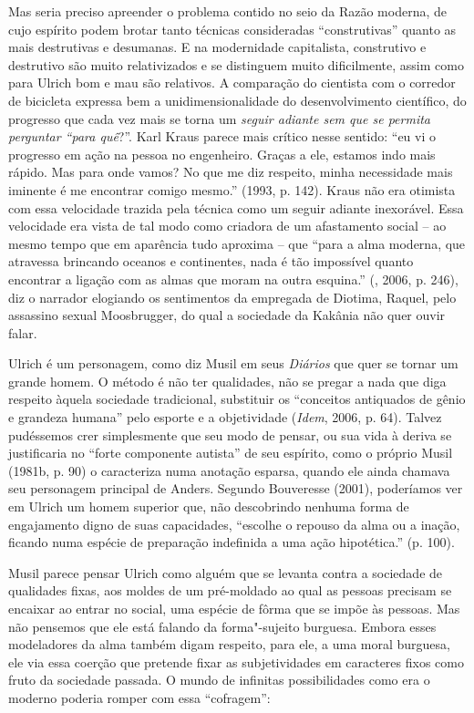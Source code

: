 Mas seria preciso apreender o problema contido no seio da Razão moderna,
de cujo espírito podem brotar tanto técnicas consideradas
``construtivas'' quanto as mais destrutivas e desumanas. E na
modernidade capitalista, construtivo e destrutivo são muito
relativizados e se distinguem muito dificilmente, assim como para Ulrich
bom e mau são relativos. A comparação do cientista com o corredor de
bicicleta expressa bem a unidimensionalidade do desenvolvimento
científico, do progresso que cada vez mais se torna um \emph{seguir
adiante sem que se permita perguntar ``para quê}?''. Karl Kraus parece
mais crítico nesse sentido: ``eu vi o progresso em ação na pessoa no
engenheiro. Graças a ele, estamos indo mais rápido. Mas para onde vamos?
No que me diz respeito, minha necessidade mais iminente é me encontrar
comigo mesmo.'' (1993, p. 142). Kraus não era otimista com essa
velocidade trazida pela técnica como um seguir adiante inexorável. Essa
velocidade era vista de tal modo como criadora de um afastamento social
-- ao mesmo tempo que em aparência tudo aproxima -- que ``para a alma
moderna, que atravessa brincando oceanos e continentes, nada é tão
impossível quanto encontrar a ligação com as almas que moram na outra
esquina.'' (, 2006, p. 246), diz o narrador elogiando os
sentimentos da empregada de Diotima, Raquel, pelo assassino sexual
Moosbrugger, do qual a sociedade da Kakânia não quer ouvir falar.

Ulrich é um personagem, como diz Musil em seus \emph{Diários} que quer
se tornar um grande homem. O método é não ter qualidades, não se pregar
a nada que diga respeito àquela sociedade tradicional, substituir os
``conceitos antiquados de gênio e grandeza humana'' pelo esporte e a
objetividade (\emph{Idem}, 2006, p. 64). Talvez pudéssemos crer simplesmente
que seu modo de pensar, ou sua vida à deriva se justificaria no ``forte
componente autista'' de seu espírito, como o próprio Musil (1981b, p.
90) o caracteriza numa anotação esparsa, quando ele ainda chamava seu
personagem principal de Anders. Segundo Bouveresse (2001), poderíamos
ver em Ulrich um homem superior que, não descobrindo nenhuma forma de
engajamento digno de suas capacidades, ``escolhe o repouso da alma ou a
inação, ficando numa espécie de preparação indefinida a uma ação
hipotética.'' (p. 100).

Musil parece pensar Ulrich como alguém que se levanta contra a sociedade
de qualidades fixas, aos moldes de um pré-moldado ao qual as pessoas
precisam se encaixar ao entrar no social, uma espécie de fôrma que se
impõe às pessoas. Mas não pensemos que ele está falando da forma"-sujeito
burguesa. Embora esses modeladores da alma também digam respeito, para
ele, a uma moral burguesa, ele via essa coerção que pretende fixar as
subjetividades em caracteres fixos como fruto da sociedade passada. O
mundo de infinitas possibilidades como era o moderno poderia romper com
essa ``cofragem'':

